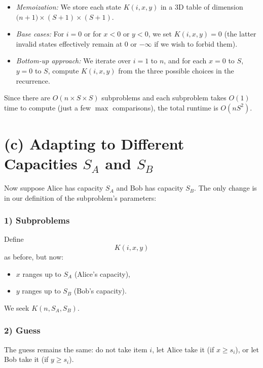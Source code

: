 \documentclass[11pt]{article}
\begin{document}
    \begin{itemize}
        \item \emph{Memoization:} We store each state \(K(i,x,y)\) in a 3D table of dimension \(\bigl(n+1\bigr) \times (S+1) \times (S+1)\). 
        \item \emph{Base cases:} For \(i=0\) or for \(x<0\) or \(y<0\), we set \(K(i,x,y)=0\) (the latter invalid states effectively remain at 0 or \(-\infty\) if we wish to forbid them).
        \item \emph{Bottom-up approach:} We iterate over \(i=1\) to \(n\), and for each \(x=0\) to \(S\), \(y=0\) to \(S\), compute \(K(i,x,y)\) from the three possible choices in the recurrence.
    \end{itemize}
    
    Since there are \(O(n \times S \times S)\) subproblems and each subproblem takes \(O(1)\) time to compute (just a few \(\max\) comparisons), the total runtime is \(O(nS^2)\).
    
    \bigskip
    
    \section*{(c) Adapting to Different Capacities \(S_A\) and \(S_B\)}
    
    Now suppose Alice has capacity \(S_A\) and Bob has capacity \(S_B\). The only change is in our definition of the subproblem’s parameters:
    
    \subsubsection*{1) Subproblems}
    
    Define
    \[
    K(i, x, y)
    \]
    as before, but now:
    \begin{itemize}
        \item \(x\) ranges up to \(S_A\) (Alice's capacity),
        \item \(y\) ranges up to \(S_B\) (Bob's capacity).
    \end{itemize}
    We seek \(K(n, S_A, S_B)\).
    
    \subsubsection*{2) Guess}
    
    The guess remains the same: do not take item \(i\), let Alice take it (if \(x \ge s_i\)), or let Bob take it (if \(y \ge s_i\)).
    
\end{document}
